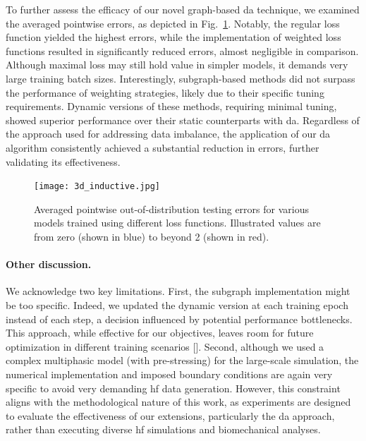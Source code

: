 To further assess the efficacy of our novel graph-based \ac{da} technique, we examined the averaged pointwise errors, as depicted in Fig.~\ref{fig:3d_inductive}. Notably, the regular loss function yielded the highest errors, while the implementation of weighted loss functions resulted in significantly reduced errors, almost negligible in comparison. Although maximal loss may still hold value in simpler models, it demands very large training batch sizes. Interestingly, subgraph-based methods did not surpass the performance of weighting strategies, likely due to their specific tuning requirements. Dynamic versions of these methods, requiring minimal tuning, showed superior performance over their static counterparts with \ac{da}. Regardless of the approach used for addressing data imbalance, the application of our \ac{da} algorithm consistently achieved a substantial reduction in errors, further validating its effectiveness.
%
\begin{figure}\centering
\texttt{[image: 3d\_inductive.jpg]}
\caption{Averaged pointwise out-of-distribution testing errors for various models trained using different loss functions. Illustrated values are from zero (shown in blue) to beyond 2 (shown in red).}\label{fig:3d_inductive}
\end{figure}

\paragraph{Other discussion.} We acknowledge two key limitations. First, the subgraph implementation might be too specific. Indeed, we updated the dynamic version at each training epoch instead of each step, a decision influenced by potential performance bottlenecks. This approach, while effective for our objectives, leaves room for future optimization in different training scenarios [\cite{xue2023}]. Second, although we used a complex multiphasic model (with pre-stressing) for the large-scale simulation, the numerical implementation and imposed boundary conditions are again very specific to avoid very demanding \ac{hf} data generation. However, this constraint aligns with the methodological nature of this work, as experiments are designed to evaluate the effectiveness of our extensions, particularly the \ac{da} approach, rather than executing diverse \ac{hf} simulations and biomechanical analyses.


